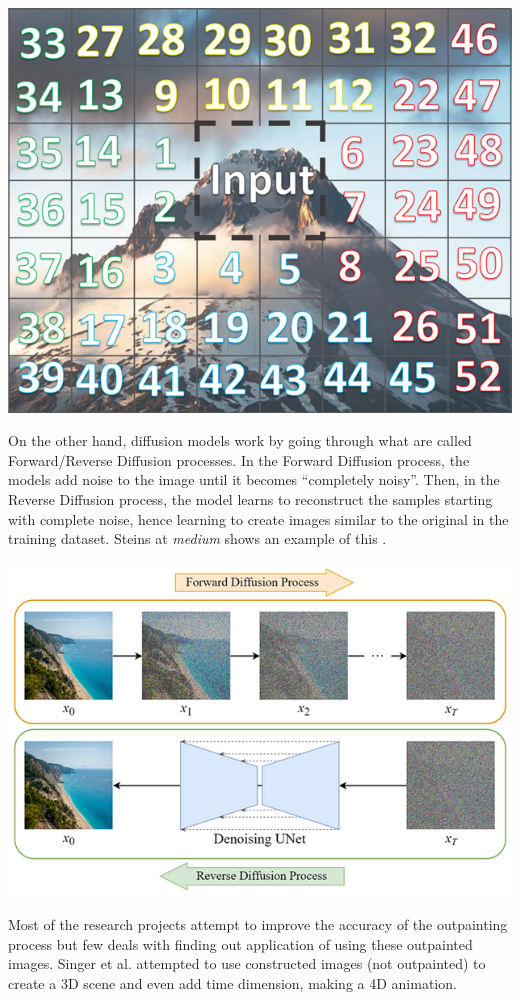 \documentclass[conference]{IEEEtran}
\begin{document}
\includegraphics[scale=0.5]{autoregresive.png}

On the other hand, diffusion models work by going through what are called Forward/Reverse Diffusion processes. In the Forward Diffusion process, the models add noise to the image until it becomes “completely noisy”. Then, in the Reverse Diffusion process, the model learns to reconstruct the samples starting with complete noise, hence learning to create images similar to the original in the training dataset. Steins at \emph{medium} shows an example of this \cite{diffusionModel}.

\includegraphics[scale=0.5]{diffusion.png}

Most of the research projects attempt to improve the accuracy of the outpainting process but few deals with finding out application of using these outpainted images. Singer et al. attempted to use constructed images (not outpainted) to create a 3D scene and even add time dimension, making a 4D animation. \cite[section 4.4.4]{singer2023textto4d}
\end{document}
